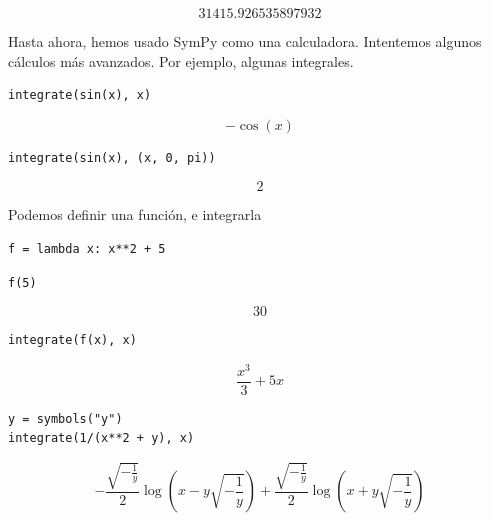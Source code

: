 \[31415.926535897932\]

Hasta ahora, hemos usado SymPy como una calculadora. Intentemos algunos
cálculos más avanzados. Por ejemplo, algunas integrales.

\begin{listing}[H]
\begin{verbatim}
integrate(sin(x), x)
\end{verbatim}
\end{listing}

\[- \cos{\left (x \right )}\]

\begin{listing}[H]
\begin{verbatim}
integrate(sin(x), (x, 0, pi))
\end{verbatim}
\end{listing}

\[2\]

Podemos definir una función, e integrarla

\begin{listing}[H]
\begin{verbatim}
f = lambda x: x**2 + 5
\end{verbatim}
\end{listing}

\begin{listing}[H]
\begin{verbatim}
f(5)
\end{verbatim}
\end{listing}

\[30\]

\begin{listing}[H]
\begin{verbatim}
integrate(f(x), x)
\end{verbatim}
\end{listing}

\[\frac{x^{3}}{3} + 5 x\]

\begin{listing}[H]
\begin{verbatim}
y = symbols("y")
integrate(1/(x**2 + y), x)
\end{verbatim}
\end{listing}

\[- \frac{\sqrt{- \frac{1}{y}}}{2} \log{\left (x - y \sqrt{- \frac{1}{y}} \right )} + \frac{\sqrt{- \frac{1}{y}}}{2} \log{\left (x + y \sqrt{- \frac{1}{y}} \right )}\]

